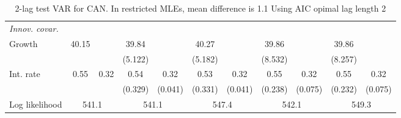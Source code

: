 \begin{table}[htbp]
\begin{tabular}{@{\extracolsep{4pt}}lcccccccccc@{}}
\rule{0pt}{4ex} \emph{Innov. covar.}  	 & 	 & 	 & 	 & 	 & 	 & 	 & 	 & 	 & 	 &\\ 
\quad Growth 	 &40.15 	 &  	 & 39.84 	 &  	 & 40.27 	 &  	 & 39.86 	 &  	 & 39.86 	 & 	 \\ 
 		 &  	 &  	 & (5.122) 	 &  	 & (5.182) 	 &  	 & (8.532) 	 &  	 & (8.257) 	 &  	 \\ 
\quad Int. rate 	 &0.55 	 & 0.32 	 & 0.54 	 & 0.32 	 & 0.53 	 & 0.32 	 & 0.55 	 & 0.32 	 & 0.55 	 & 0.32	 \\ 
 		 &  	 &  	 & (0.329) 	 & (0.041) 	 & (0.331) 	 & (0.041) 	 & (0.238) 	 & (0.075) 	 & (0.232) 	 & (0.075) 	 \\ 
 \hline \rule{0pt}{4ex} 
  Log likelihood 	 &\multicolumn{2}{c}{541.1} 	 & \multicolumn{2}{c}{541.1} 	 & \multicolumn{2}{c}{547.4} 	 & \multicolumn{2}{c}{542.1} 	 & \multicolumn{2}{c}{549.3}\\ 

 \hline 	\end{tabular}		\caption{2-lag test VAR for CAN. In restricted MLEs, mean difference is 1.1 Using AIC opimal lag length 2}
		\label{tab:CANopt_}

\end{table}